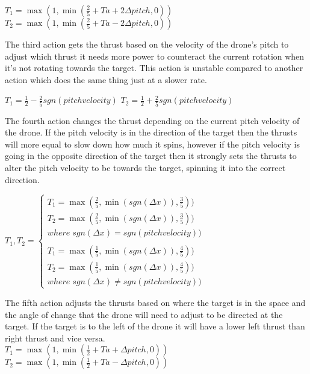 \begingroup\centering
$T_1 = \max (1,\min (\frac{2}{5}+Ta+2\Delta pitch,0))$
$T_2 = \max (1,\min (\frac{2}{5}+Ta-2\Delta pitch,0))$

\endgroup

The third action gets the thrust based on the velocity of the drone's pitch to adjust which thrust it needs more power to counteract the current rotation when it’s not rotating towards the target. This action is unstable compared to another action which does the same thing just at a slower rate.

\begingroup\centering

$T_1 = \frac{1}{2} - \frac{2}{5} sgn (pitchvelocity)$
$T_2 = \frac{1}{2} + \frac{2}{5} sgn (pitchvelocity)$

\endgroup

The fourth action changes the thrust depending on the current pitch velocity of the drone. If the pitch velocity is in the direction of the target then the thrusts will more equal to slow down how much it spins, however if the pitch velocity is going in the opposite direction of the target then it strongly sets the thrusts to alter the pitch velocity to be towards the target, spinning it into the correct direction.

\begingroup\centering
$
T_1, T_2 = 
\left\{\begin{matrix}
    T_1 = \max (\frac{2}{5},\min (sgn(\Delta x)),\frac{3}{5})) \\
    T_2 = \max (\frac{2}{5},\min (sgn(\Delta x)),\frac{3}{5}))
    \\ where\;sgn(\Delta x) = sgn(pitchvelocity))
    \\ \\
    T_1 = \max (\frac{1}{5},\min (sgn(\Delta x)),\frac{4}{5})) \\
    T_2 = \max (\frac{1}{5},\min (sgn(\Delta x)),\frac{4}{5}))
    \\ where\;sgn(\Delta x) \neq sgn(pitchvelocity))

    \end{matrix}\right.$

\endgroup

The fifth action adjusts the thrusts based on where the target is in the space and the angle of change that the drone will need to adjust to be directed at the target. If the target is to the left of the drone it will have a lower left thrust than right thrust and vice versa. 
\\
\begingroup\centering
$T_1 = \max (1,\min (\frac{1}{2}+Ta+\Delta pitch,0))$
$T_2 = \max (1,\min (\frac{1}{2}+Ta-\Delta pitch,0))$

